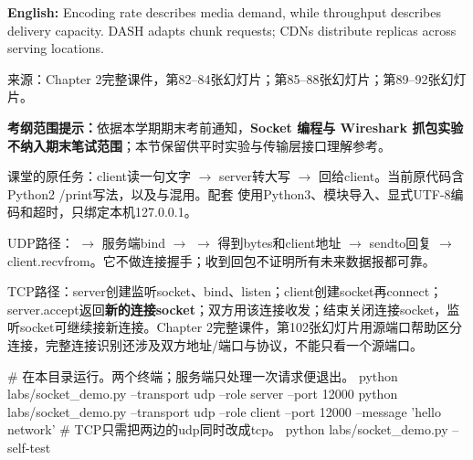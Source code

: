 \textbf{English:} Encoding rate describes media demand, while throughput describes delivery capacity. DASH adapts chunk requests; CDNs distribute replicas across serving locations.


来源：Chapter 2完整课件，第82–84张幻灯片；第85–88张幻灯片；第89–92张幻灯片。








\textbf{考纲范围提示：}依据本学期期末考前通知，\textbf{Socket 编程与 Wireshark 抓包实验不纳入期末笔试范围}；本节保留供平时实验与传输层接口理解参考。

课堂的原任务：client读一句文字 \ensuremath{\to} server转大写 \ensuremath{\to} 回给client。当前原代码含Python2 /print写法，以及与混用。配套  使用Python3、模块导入、显式UTF-8编码和超时，只绑定本机127.0.0.1。


UDP路径： \ensuremath{\to} 服务端bind \ensuremath{\to}  \ensuremath{\to} 得到bytes和client地址 \ensuremath{\to} sendto回复 \ensuremath{\to} client.recvfrom。它不做连接握手；收到回包不证明所有未来数据报都可靠。




TCP路径：server创建监听socket、bind、listen；client创建socket再connect；server.accept返回\textbf{新的连接socket}；双方用该连接收发；结束关闭连接socket，监听socket可继续接新连接。Chapter 2完整课件，第102张幻灯片用源端口帮助区分连接，完整连接识别还涉及双方地址/端口与协议，不能只看一个源端口。



\begin{StudyCode}
# 在本目录运行。两个终端；服务端只处理一次请求便退出。
python labs/socket_demo.py --transport udp --role server --port 12000
python labs/socket_demo.py --transport udp --role client --port 12000 --message 'hello network'
# TCP只需把两边的udp同时改成tcp。
python labs/socket_demo.py --self-test
\end{StudyCode}


